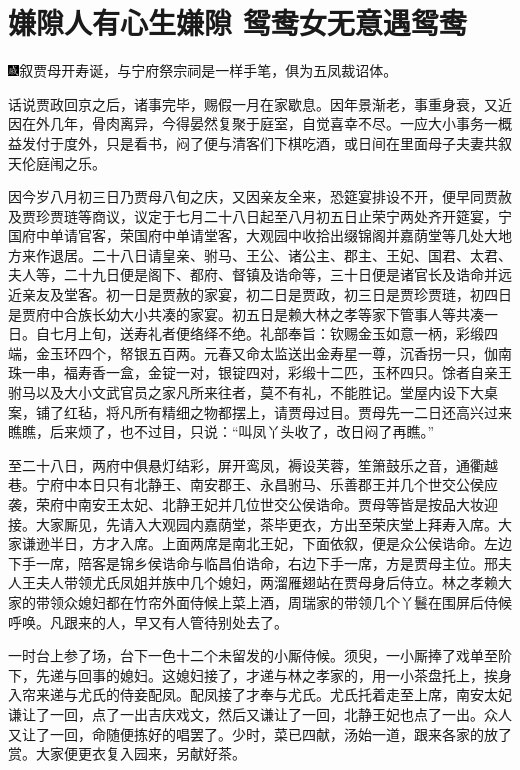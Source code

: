 
\chapter{嫌隙人有心生嫌隙 鸳鸯女无意遇鸳鸯}

{\includegraphics[width=3mm]{../Images/00005}\kaishu 叙贾母开寿诞，与宁府祭宗祠是一样手笔，俱为五凤裁诏体。}

话说贾政回京之后，诸事完毕，赐假一月在家歇息。因年景渐老，事重身衰，又近因在外几年，骨肉离异，今得晏然复聚于庭室，自觉喜幸不尽。一应大小事务一概益发付于度外，只是看书，闷了便与清客们下棋吃酒，或日间在里面母子夫妻共叙天伦庭闱之乐。

因今岁八月初三日乃贾母八旬之庆，又因亲友全来，恐筵宴排设不开，便早同贾赦及贾珍贾琏等商议，议定于七月二十八日起至八月初五日止荣宁两处齐开筵宴，宁国府中单请官客，荣国府中单请堂客，大观园中收拾出缀锦阁并嘉荫堂等几处大地方来作退居。二十八日请皇亲、驸马、王公、诸公主、郡主、王妃、国君、太君、夫人等，二十九日便是阁下、都府、督镇及诰命等，三十日便是诸官长及诰命并远近亲友及堂客。初一日是贾赦的家宴，初二日是贾政，初三日是贾珍贾琏，初四日是贾府中合族长幼大小共凑的家宴。初五日是赖大林之孝等家下管事人等共凑一日。自七月上旬，送寿礼者便络绎不绝。礼部奉旨：钦赐金玉如意一柄，彩缎四端，金玉环四个，帑银五百两。元春又命太监送出金寿星一尊，沉香拐一只，伽南珠一串，福寿香一盒，金锭一对，银锭四对，彩缎十二匹，玉杯四只。馀者自亲王驸马以及大小文武官员之家凡所来往者，莫不有礼，不能胜记。堂屋内设下大桌案，铺了红毡，将凡所有精细之物都摆上，请贾母过目。贾母先一二日还高兴过来瞧瞧，后来烦了，也不过目，只说：``叫凤丫头收了，改日闷了再瞧。''

至二十八日，两府中俱悬灯结彩，屏开鸾凤，褥设芙蓉，笙箫鼓乐之音，通衢越巷。宁府中本日只有北静王、南安郡王、永昌驸马、乐善郡王并几个世交公侯应袭，荣府中南安王太妃、北静王妃并几位世交公侯诰命。贾母等皆是按品大妆迎接。大家厮见，先请入大观园内嘉荫堂，茶毕更衣，方出至荣庆堂上拜寿入席。大家谦逊半日，方才入席。上面两席是南北王妃，下面依叙，便是众公侯诰命。左边下手一席，陪客是锦乡侯诰命与临昌伯诰命，右边下手一席，方是贾母主位。邢夫人王夫人带领尤氏凤姐并族中几个媳妇，两溜雁翅站在贾母身后侍立。林之孝赖大家的带领众媳妇都在竹帘外面侍候上菜上酒，周瑞家的带领几个丫鬟在围屏后侍候呼唤。凡跟来的人，早又有人管待别处去了。

一时台上参了场，台下一色十二个未留发的小厮侍候。须臾，一小厮捧了戏单至阶下，先递与回事的媳妇。这媳妇接了，才递与林之孝家的，用一小茶盘托上，挨身入帘来递与尤氏的侍妾配凤。配凤接了才奉与尤氏。尤氏托着走至上席，南安太妃谦让了一回，点了一出吉庆戏文，然后又谦让了一回，北静王妃也点了一出。众人又让了一回，命随便拣好的唱罢了。少时，菜已四献，汤始一道，跟来各家的放了赏。大家便更衣复入园来，另献好茶。

